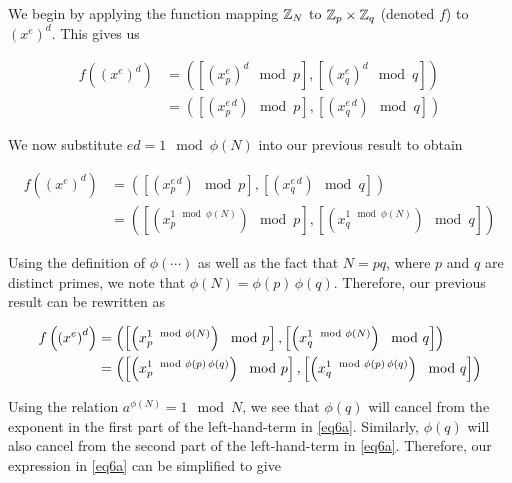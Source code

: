 \documentclass[../CryptoHW3.tex]{subfiles}
\begin{document}
\begin{flushleft}



  We begin by applying the function mapping $\mathbb{Z}_N$ to $\mathbb{Z}_p \times \mathbb{Z}_q$ (denoted $f$) to $\left( x^e \right)^d$.  This gives us

\begin{align*}
  f \left( \left( x^e \right)^d \right) &= \left( \left[ \left( x_p^e \right)^d \mod p \right], \left[ \left( x_q^e \right)^d \mod q \right] \right) \\
  &= \left( \left[ \left( x_p^{e \, d} \right) \mod p \right], \left[ \left( x_q^{e \, d} \right) \mod q \right] \right)
\end{align*}

We now substitute $ed = 1 \mod \phi \left( N \right)$ into our previous result to obtain

\begin{align*}
  f \left( \left( x^e \right)^d \right) &= \left( \left[ \left( x_p^{e \, d} \right) \mod p \right], \left[ \left( x_q^{e \, d} \right) \mod q \right] \right) \\
  &= \left( \left[ \left( x_p^{1 \mod \phi \left( N \right)} \right) \mod p \right], \left[ \left( x_q^{1 \mod \phi \left( N \right)} \right) \mod q \right] \right)
\end{align*}

Using the definition of $\phi \left( \cdots \right)$ as well as the fact that $N = p q$, where $p$ and $q$ are distinct primes, we note that $\phi \left( N \right) = \phi \left( p \right) \, \phi \left( q \right)$.  Therefore, our previous result can be rewritten as

\begin{align}
  f \left( \left( x^e \right)^d \right) &= \left( \left[ \left( x_p^{1 \mod \phi \left( N \right)} \right) \mod p \right], \left[ \left( x_q^{1 \mod \phi \left( N \right)} \right) \mod q \right] \right) \notag \\
  &= \left( \left[ \left( x_p^{1 \mod \phi \left( p \right) \, \phi \left( q \right)} \right) \mod p \right], \left[ \left( x_q^{1 \mod \phi \left( p \right) \, \phi \left( q \right)} \right) \mod q \right] \right) \label{eq6a}
\end{align}

Using the relation $a^{\phi \left( N \right)} = 1 \mod N$, we see that $\phi \left( q \right)$ will cancel from the exponent in the first part of the left-hand-term in \ref{eq6a}.  Similarly, $\phi \left( q \right)$ will also cancel from the second part of the left-hand-term in \ref{eq6a}.  Therefore, our expression in \ref{eq6a} can be simplified to give


\end{flushleft}
\end{document}

